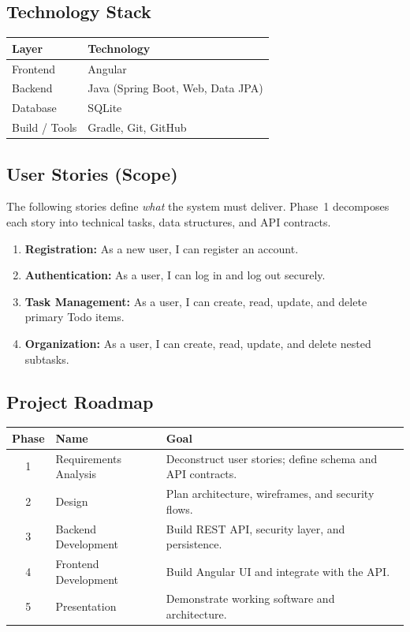 \documentclass{article}
\begin{document}
\subsection{Technology Stack}
\begin{tabularx}{\textwidth}{@{} l X @{}}
\toprule
\textbf{Layer} & \textbf{Technology} \\
\midrule
Frontend       & Angular \\
Backend        & Java (Spring Boot, Web, Data JPA) \\
Database       & SQLite \\
Build / Tools  & Gradle, Git, GitHub \\
\bottomrule
\end{tabularx}

\subsection{User Stories (Scope)}
The following stories define \emph{what} the system must deliver. Phase~1 decomposes
each story into technical tasks, data structures, and API contracts.

\begin{enumerate}
  \item \textbf{Registration:} As a new user, I can register an account.
  \item \textbf{Authentication:} As a user, I can log in and log out securely.
  \item \textbf{Task Management:} As a user, I can create, read, update, and delete primary Todo items.
  \item \textbf{Organization:} As a user, I can create, read, update, and delete nested subtasks.
\end{enumerate}

\subsection{Project Roadmap}
\begin{tabularx}{\textwidth}{@{} c l X @{}}
\toprule
\textbf{Phase} & \textbf{Name} & \textbf{Goal} \\
\midrule
1 & Requirements Analysis & Deconstruct user stories; define schema and API contracts. \\
2 & Design                & Plan architecture, wireframes, and security flows. \\
3 & Backend Development   & Build REST API, security layer, and persistence. \\
4 & Frontend Development  & Build Angular UI and integrate with the API. \\
5 & Presentation          & Demonstrate working software and architecture. \\
\bottomrule
\end{tabularx}
\end{document}
